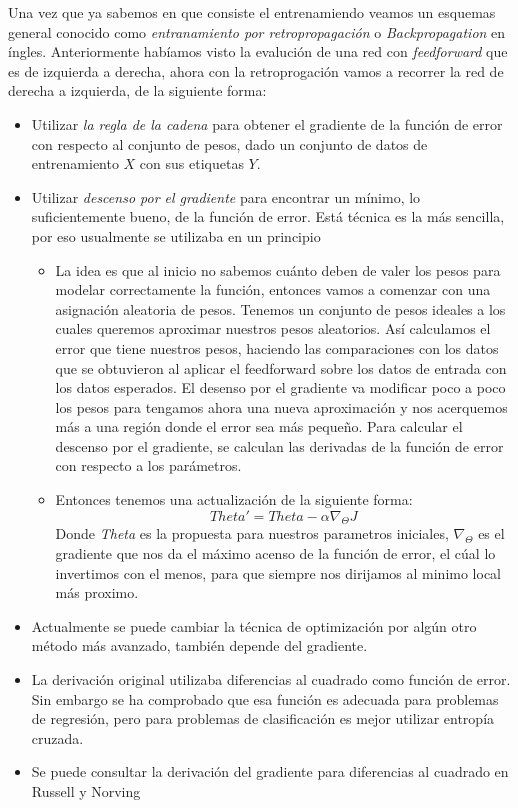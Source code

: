Una vez que ya sabemos en que consiste el entrenamiendo veamos un esquemas general conocido como \emph{entranamiento por retropropagación} o \textit{Backpropagation} en íngles. Anteriormente habíamos visto la evalución de una red con \textit{feedforward} que es de izquierda a derecha, ahora con la retroprogación vamos a recorrer la red de derecha a izquierda, de la siguiente forma:
\begin{itemize}
 \item Utilizar \emph{la regla de la cadena} para obtener el gradiente de la función de error con
respecto al conjunto de pesos, dado un conjunto de datos de entrenamiento \emph{$X$} con sus etiquetas \emph{$Y$}.
\item Utilizar \emph{descenso por el gradiente} para encontrar un mínimo, lo suficientemente
bueno, de la función de error. Está técnica es la más sencilla, por eso usualmente se utilizaba en un principio
\begin{itemize}
 \item La idea es que al inicio no sabemos cuánto deben de valer los pesos para modelar correctamente la función, entonces vamos a comenzar con una asignación aleatoria de pesos. Tenemos un conjunto de pesos ideales a los cuales queremos aproximar nuestros pesos aleatorios. Así calculamos el error que tiene nuestros pesos, haciendo las comparaciones con los datos que se obtuvieron al aplicar el feedforward sobre los datos de entrada con los datos esperados. El desenso por el gradiente va modificar poco a poco los pesos para tengamos ahora una nueva aproximación y nos acerquemos más a una región donde el error sea más pequeño.
 Para calcular el descenso por el gradiente, se calculan las derivadas de la función de error con respecto a los parámetros. 
 \item Entonces tenemos una actualización de la siguiente forma: 
    \begin{equation}
     Theta' = Theta - \alpha \nabla_{\Theta}J
    \end{equation}
        Donde \emph{Theta} es la propuesta para nuestros parametros iniciales, $\nabla_{\Theta}$ es el gradiente que nos da el máximo acenso de la función de error, el cúal lo invertimos con el menos, para que siempre nos dirijamos al minimo local más proximo.  
\end{itemize}
\item Actualmente se puede cambiar la técnica de optimización por algún otro método
más avanzado, también depende del gradiente.

\item La derivación original utilizaba diferencias al cuadrado como función de error. Sin
embargo se ha comprobado que esa función es adecuada para problemas de
regresión, pero para problemas de clasificación es mejor utilizar entropía cruzada.
\item Se puede consultar la derivación del gradiente para diferencias al cuadrado en
Russell y Norving
\end{itemize}

